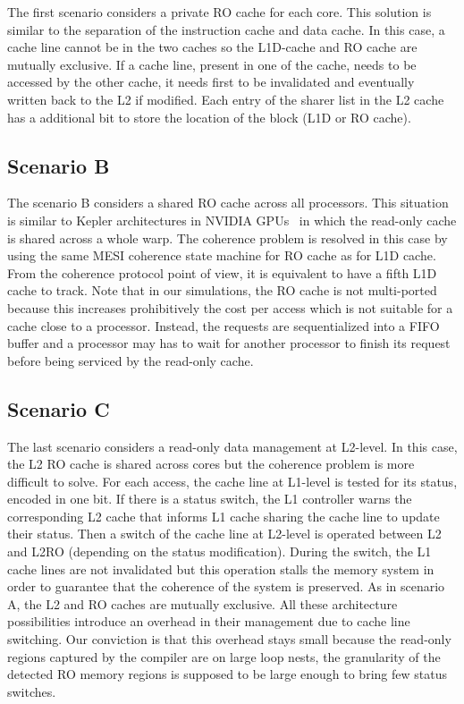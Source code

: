 \documentclass[sigconf]{acmart}
\begin{document}
The first scenario considers a private RO cache for each core. This solution is similar to the separation of the instruction cache and data cache. In this case, a cache line cannot be in the two caches so the L1D-cache and RO cache are mutually exclusive. If a cache line, present in one of the cache, needs to be accessed by the other cache, it needs first to be invalidated and eventually written back to the L2 if modified. Each entry of the sharer list in the L2 cache has a additional bit to store the location of the block (L1D or RO cache). 

\subsection{Scenario B}

The scenario B considers a shared RO cache across all processors. This situation is similar to Kepler architectures in NVIDIA GPUs~\cite{NVIDIA:2007} in which the read-only cache is shared across a whole warp. The coherence problem is resolved in this case by using the same MESI coherence state machine for RO cache as for L1D cache. From the coherence protocol point of view, it is equivalent to have a fifth L1D cache to track. Note that in our simulations, the RO cache is not multi-ported because this increases prohibitively the cost per access which is not suitable for a cache close to a processor. Instead, the requests are sequentialized into a FIFO buffer and a processor may has to wait for another processor to finish its request before being serviced by the read-only cache.


\subsection{Scenario C}
The last scenario considers a read-only data management at L2-level. In this case, the L2 RO cache is shared across cores but the coherence problem is more difficult to solve. For each access, the cache line at L1-level is tested for its status, encoded in one bit. If there is a status switch, the L1 controller warns the corresponding L2 cache that informs L1 cache sharing the cache line to update their status. Then a switch of the cache line at L2-level is operated between L2 and L2RO (depending on the status modification). During the switch, the L1 cache lines are not invalidated but this operation stalls the memory system in order to guarantee that the coherence of the system is preserved. As in scenario A, the L2 and RO caches are mutually exclusive. All these architecture possibilities introduce an overhead in their management due to cache line switching. Our conviction is that this overhead stays small because the read-only regions captured by the compiler are on large loop nests, the granularity of the detected RO memory regions is supposed to be large enough to bring few status switches.
\end{document}
